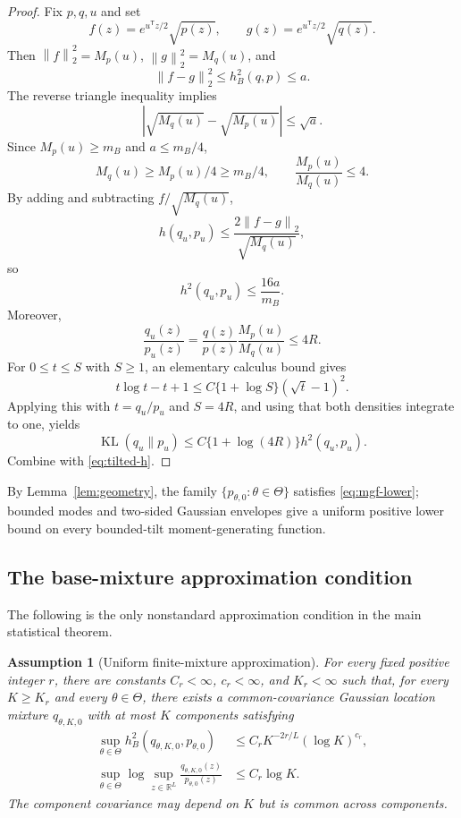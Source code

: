 \documentclass[11pt]{article}
\newtheorem{assumption}[theorem]{Assumption}
\theoremstyle{definition}
\newcommand{\R}{\mathbb R}
\newcommand{\KL}{\operatorname{KL}}
\newcommand{\trans}{\mathsf T}
\newcommand{\norm}[1]{\left\lVert #1\right\rVert}
\newcommand{\abs}[1]{\left\lvert #1\right\rvert}
\begin{document}
\begin{proof}
Fix $p,q,u$ and set
\[
f(z)=e^{u^{\trans}z/2}\sqrt{p(z)},
\qquad
g(z)=e^{u^{\trans}z/2}\sqrt{q(z)}.
\]
Then $\norm{f}_2^2=M_p(u)$, $\norm{g}_2^2=M_q(u)$, and
\[
\norm{f-g}_2^2
\le h_B^2(q,p)\le a.
\]
The reverse triangle inequality implies
\[
\abs{\sqrt{M_q(u)}-\sqrt{M_p(u)}}\le\sqrt a.
\]
Since $M_p(u)\ge m_B$ and $a\le m_B/4$,
\begin{equation}
M_q(u)\ge M_p(u)/4\ge m_B/4,
\qquad
\frac{M_p(u)}{M_q(u)}\le4.
\label{eq:normalizer-bounds}
\end{equation}
By adding and subtracting $f/\sqrt{M_q(u)}$,
\[
h(q_u,p_u)
\le
\frac{2\norm{f-g}_2}{\sqrt{M_q(u)}},
\]
so
\begin{equation}
h^2(q_u,p_u)\le \frac{16a}{m_B}.
\label{eq:tilted-h}
\end{equation}
Moreover,
\[
\frac{q_u(z)}{p_u(z)}
=
\frac{q(z)}{p(z)}\frac{M_p(u)}{M_q(u)}
\le4R.
\]
For $0\le t\le S$ with $S\ge1$, an elementary calculus bound gives
\[
t\log t-t+1
\le C\{1+\log S\}(\sqrt t-1)^2.
\]
Applying this with $t=q_u/p_u$ and $S=4R$, and using that both densities integrate to one, yields
\[
\KL(q_u\|p_u)
\le C\{1+\log(4R)\}h^2(q_u,p_u).
\]
Combine with \cref{eq:tilted-h}.
\end{proof}

By Lemma~\ref{lem:geometry}, the family $\{p_{\theta,0}:\theta\in\Theta\}$ satisfies \cref{eq:mgf-lower}; bounded modes and two-sided Gaussian envelopes give a uniform positive lower bound on every bounded-tilt moment-generating function.

\subsection{The base-mixture approximation condition}

The following is the only nonstandard approximation condition in the main statistical theorem.

\begin{assumption}[Uniform finite-mixture approximation]
\label{ass:approx}
For every fixed positive integer $r$, there are constants $C_r<\infty$, $c_r<\infty$, and $K_r<\infty$ such that, for every $K\ge K_r$ and every $\theta\in\Theta$, there exists a common-covariance Gaussian location mixture $q_{\theta,K,0}$ with at most $K$ components satisfying
\begin{align}
\sup_{\theta\in\Theta}
h_B^2(q_{\theta,K,0},p_{\theta,0})
&\le
C_r K^{-2r/L}(\log K)^{c_r},
\label{eq:base-h-rate}\\
\sup_{\theta\in\Theta}
\log\sup_{z\in\R^L}
\frac{q_{\theta,K,0}(z)}{p_{\theta,0}(z)}
&\le C_r\log K.
\label{eq:ratio-rate}
\end{align}
The component covariance may depend on $K$ but is common across components.
\end{assumption}
\end{document}
